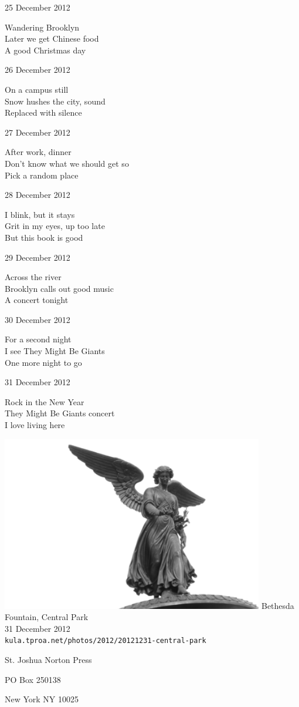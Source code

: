 \documentclass[12pt]{article}
\begin{document}
\newpage

25 December 2012

Wandering Brooklyn \\
Later we get Chinese food \\
A good Christmas day

26 December 2012

On a campus still \\
Snow hushes the city, sound \\
Replaced with silence

27 December 2012

After work, dinner \\
Don't know what we should get so \\
Pick a random place

28 December 2012

I blink, but it stays \\
Grit in my eyes, up too late \\
But this book is good

29 December 2012

Across the river \\
Brooklyn calls out good music \\
A concert tonight

30 December 2012

For a second night \\
I see They Might Be Giants \\
One more night to go

31 December 2012

Rock in the New Year \\
They Might Be Giants concert \\
I love living here


\newpage

\begin{center}
\includegraphics[width=325pt]{angel.png}
Bethesda Fountain, Central Park \\
31 December 2012 \\
{\tt kula.tproa.net/photos/2012/20121231-central-park }
\end{center}

\newpage

\thispagestyle{empty}
\vspace*{12cm}
\begin{sideways}
\Large{St. Joshua Norton Press}
\end{sideways}
\begin{sideways}
\Large{PO Box 250138}
\end{sideways}
\begin{sideways}
\Large{New York NY 10025}
\end{sideways}
\end{document}
